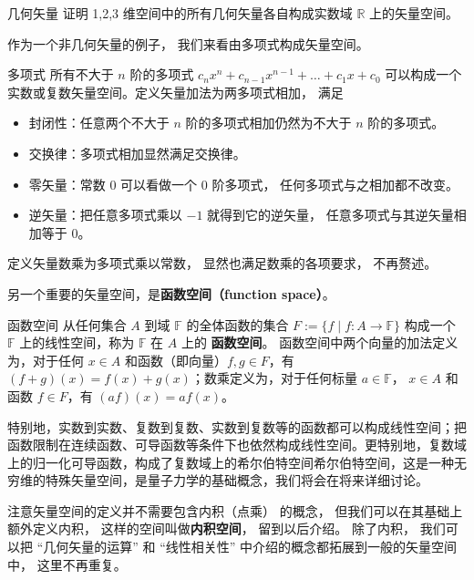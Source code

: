 \begin{exercise}{几何矢量}
证明 1,2,3 维空间中的所有几何矢量各自构成实数域 $\mathbb R$ 上的矢量空间。
\end{exercise}

作为一个非几何矢量的例子， 我们来看由多项式构成矢量空间。

\begin{example}{多项式}\label{ex_LSpace_1}
所有不大于 $n$ 阶的多项式 $c_n x^n + c_{n-1} x^{n-1} + \dots + c_1 x + c_0$ 可以构成一个实数或复数矢量空间。定义矢量加法为两多项式相加， 满足
\begin{itemize}
\item 封闭性：任意两个不大于 $n$ 阶的多项式相加仍然为不大于 $n$ 阶的多项式。
\item 交换律：多项式相加显然满足交换律。
\item 零矢量：常数 0 可以看做一个 0 阶多项式， 任何多项式与之相加都不改变。
\item 逆矢量：把任意多项式乘以 $-1$ 就得到它的逆矢量， 任意多项式与其逆矢量相加等于 0。
\end{itemize}
定义矢量数乘为多项式乘以常数， 显然也满足数乘的各项要求， 不再赘述。
\end{example}

另一个重要的矢量空间，是\textbf{函数空间（function space）}。

\begin{example}{函数空间}\label{ex_LSpace_2}
从任何集合 $A$ 到域 $\mathbb{F}$ 的全体函数的集合 $F := \{f \mid f: A \to \mathbb{F} \}$ 构成一个 $\mathbb{F}$ 上的线性空间，称为 $\mathbb{F}$ 在 $A$ 上的 \textbf{函数空间}。 函数空间中两个向量的加法定义为，对于任何 $x \in A$ 和函数（即向量）$f, g\in F$，有 $(f+g)(x)=f(x)+g(x)$；数乘定义为，对于任何标量 $a \in \mathbb{F}$， $x \in A$ 和函数 $f \in F$，有 $(af)(x)=af(x)$。

特别地，实数到实数、复数到复数、实数到复数等的函数都可以构成线性空间；把函数限制在连续函数、可导函数等条件下也依然构成线性空间。更特别地，复数域上的归一化可导函数，构成了复数域上的希尔伯特空间希尔伯特空间，这是一种无穷维的特殊矢量空间，是量子力学的基础概念，我们将会在将来详细讨论。
\end{example}

注意矢量空间的定义并不需要包含内积（点乘） 的概念， 但我们可以在其基础上额外定义内积， 这样的空间叫做\textbf{内积空间}， 留到以后介绍。 除了内积， 我们可以把 “几何矢量的运算” 和 “线性相关性” 中介绍的概念都拓展到一般的矢量空间中， 这里不再重复。

